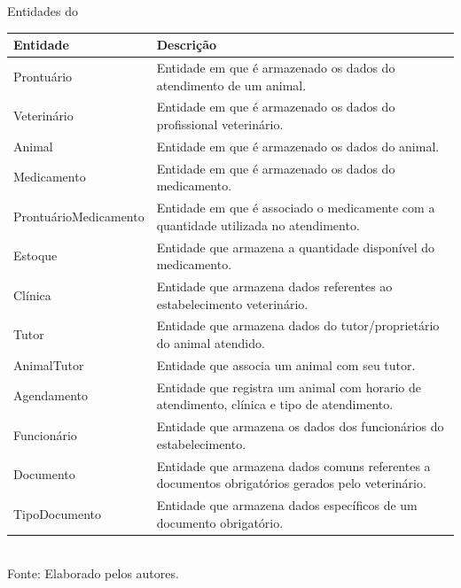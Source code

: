 \documentclass[
    12pt,               %
    openright,          %
    oneside,
    a4paper,            %
    BIBLATEX,           %
    TODO,               %
    english,            %
    brazil              %
    ]{ifsp-spo-inf-ctds}
\begin{document}
            \begin{center}
                \begin{quadro}[H]
                \centering
                \caption{Entidades do  }
                \begin{tabulary}{1.0\textwidth}{|p{10em}|p{26em}|}
                \hline
                Entidade & Descrição\\
                \hline
                Prontuário & Entidade em que é armazenado os dados do atendimento de um animal. \\
                \hline
                Veterinário & Entidade em que é armazenado os dados do profissional veterinário.\\
                \hline
                Animal & Entidade em que é armazenado os dados do animal.\\
                \hline
                Medicamento & Entidade em que é armazenado os dados do medicamento.\\
                \hline
                ProntuárioMedicamento & Entidade em que é associado o medicamente com a quantidade utilizada no atendimento.\\
                \hline
                Estoque & Entidade que armazena a quantidade disponível do medicamento.\\
                \hline
                Clínica & Entidade que armazena dados referentes ao estabelecimento veterinário.\\
                \hline
                Tutor & Entidade que armazena dados do tutor/proprietário do animal atendido.\\
                \hline
                AnimalTutor & Entidade que associa um animal com seu tutor.\\
                \hline
                Agendamento & Entidade que registra um animal com horario de atendimento, clínica e tipo de atendimento.\\
                \hline
                Funcionário & Entidade que armazena os dados dos funcionários do estabelecimento.\\
                \hline
                Documento & Entidade que armazena dados comuns referentes a documentos obrigatórios gerados pelo veterinário.\\
                \hline
                TipoDocumento & Entidade que armazena dados específicos de um documento obrigatório.\\
                \hline
                \end{tabulary}
                \label{tab: entidades} \\
                \centering
                {\footnotesize Fonte: Elaborado pelos autores.}
                \end{quadro}
            \end{center}  
\end{document}
